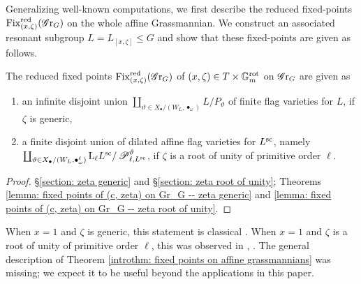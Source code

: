 Generalizing well-known computations, we first describe the reduced fixed-points $\Fix^{\red}_{(x, \zeta)}(\Gr_G)$ on the whole affine Grassmannian. We construct an associated resonant subgroup $L = L_{[x, \zeta]} \leq G$ and show that these fixed-points are given as follows.
\begin{theorem}\label{introthm: fixed points on affine grassmannians}
The reduced fixed points $\Fix^{\red}_{(x, \zeta)}(\Gr_G)$ of $(x, \zeta)\in T \times \Gm^{\rot}$ on $\Gr_G$ are given as
\begin{enumerate}
    \item[(i)] an infinite disjoint union $\coprod_{\vartheta \in X_{\bullet}/(W_L, \bullet_{\omega})} L/P_{\vartheta}$ of finite flag varieties for $L$, if $\zeta$ is generic,
    \item[(ii)] a finite disjoint union of dilated affine flag varieties for $L^{\sc}$, namely $\coprod_{\vartheta \in X_{\bullet}/(W_L, \bullet^{\ell}_{\omega})} \lo_{\ell} L^{\sc}/\eP^{\vartheta}_{\ell, L^{\sc}}$, if $\zeta$ is a root of unity of primitive order $\ell$.
\end{enumerate}
\end{theorem}
\begin{proof}
\S \ref{section: zeta generic} and \S \ref{section: zeta root of unity}; Theorems \ref{lemma: fixed points of (c, zeta) on Gr_G -- zeta generic} and \ref{lemma: fixed points of (c, zeta) on Gr_G -- zeta root of unity}.    
\end{proof}

\begin{remark}
When $x=1$ and $\zeta$ is generic, this statement is classical \cite[\S 2]{Zhu15}. When $x=1$ and $\zeta$ is a root of unity of primitive order $\ell$, this was observed in \cite[\S 4]{RW22}, \cite[\S 2]{BBSV22}. The general description of Theorem \ref{introthm: fixed points on affine grassmannians} was missing; we expect it to be useful beyond the applications in this paper. 
\end{remark}




